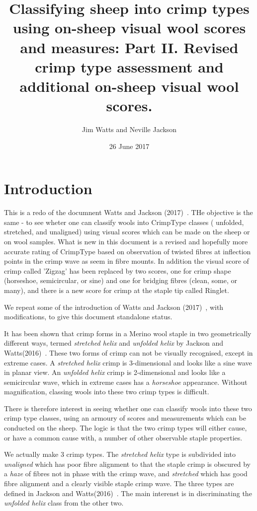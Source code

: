 \documentclass[titlepage]{article}  %
\title{Classifying sheep into crimp types using on-sheep visual wool scores and measures: Part II. Revised crimp type assessment and additional on-sheep visual wool scores. }
\author{Jim Watts and Neville Jackson}
\date{26 June 2017}
\begin{document}
 
 
\maketitle      
\tableofcontents

\clearpage
\section{Introduction} 
This is a redo of the documnent Watts and Jackson (2017)~\cite{watt:17}. THe objective is the same - to see wheter one can classify wools into CrimpType classes ( unfolded, stretched, and unaligned) using visual scores which can be made on the sheep or on wool samples. What is new in this document is a revised and hopefully more accurate rating of CrimpType based on observation of twisted fibres at inflection points in the crimp wave as seem in fibre mounts. In addition the visual score of crimp called 'Zigzag' has been replaced by two scores, one for crimp shape (horseshoe, semicircular, or sine) and one for bridging fibres (clean, some, or many), and there is a new score for crimp at the staple tip called Ringlet.

We repeat some of the introduction of Watts and Jackson (2017)~\cite{watt:17}, with modifications,  to give this document standalone status.

It has been shown that crimp forms in a Merino wool staple in two geometrically different ways, termed {\em stretched helix} and {\em unfolded helix} by Jackson and Watts(2016)~\cite{jack:16}.  These two forms of crimp can not be visually recognised, except in extreme cases. A {\em stretched helix} crimp is 3-dimensional and looks like a sine wave in planar view. An {\em unfolded helix} crimp is 2-dimensional and looks like a semicircular wave, which in extreme cases has a {\em horseshoe} appearance. Without magnification, classing wools into these two crimp types is difficult.
 
There is therefore interest in seeing whether one can classify wools into these two crimp type classes, using an armoury of scores and measurements which can be conducted on the sheep. The logic is that the two crimp types will either cause, or have a common cause  with, a number of other observable staple properties.

We actually make 3 crimp types. The {\em stretched helix} type is subdivided into {\em unaligned} which has poor fibre alignment to that the staple crimp is obscured by a {\em haze} of fibres not in phase with the crimp wave, and {\em stretched} which has good fibre alignment and a clearly visible staple crimp wave. The three types are defined in Jackson and Watts(2016)~\cite{jack:16}. The main interenst is in discriminating the {\em unfolded helix} class from the other two.
\end{document}
